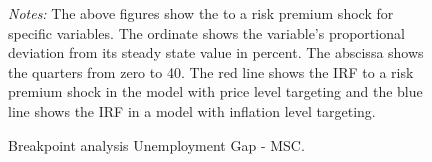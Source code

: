 \documentclass[11pt, a4paper, leqno]{article}
\begin{document}
\begin{figure}[ht!]
	\caption{Breakpoint analysis Unemployment Gap - MSC.}
	\label{fig:irf}
	\centering
    	\bigskip
	\begin{minipage}{\textwidth}%
		\footnotesize\setlength{\baselineskip}{11pt}%
		\bigskip \textit{Notes:} The above figures show the  to a risk premium shock for specific variables. The ordinate shows the variable's proportional deviation from its steady state value in percent. The abscissa shows the quarters from zero to 40. The red line shows the IRF to a risk premium shock in the model with price level targeting and the blue line shows the IRF in a model with inflation level targeting.
	\end{minipage}
\end{figure}
\end{document}
